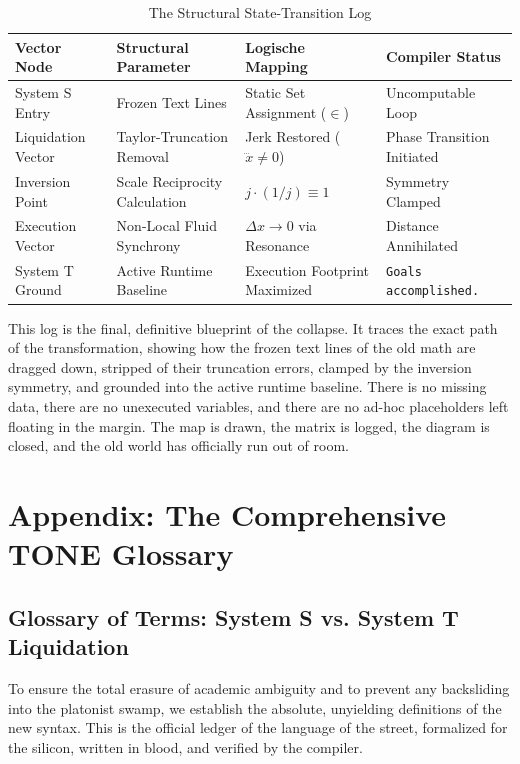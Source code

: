 \documentclass[11pt,a4paper]{article}
\begin{document}
\begin{table}[h!]
\centering
\small %
\caption{The Structural State-Transition Log}
\begin{tabular}{p{2.8cm}p{4.2cm}p{4.4cm}p{4.0cm}}
\toprule
\textbf{Vector Node} & \textbf{Structural Parameter} & \textbf{Logische Mapping} & \textbf{Compiler Status} \\
\midrule
System S Entry & Frozen Text Lines & Static Set Assignment ($\in$) & Uncomputable Loop \\
\addlinespace
Liquidation Vector & Taylor-Truncation Removal & Jerk Restored ($\dddot{x} \neq 0$) & Phase Transition Initiated \\
\addlinespace
Inversion Point & Scale Reciprocity Calculation & $j \cdot (1/j) \equiv 1$ & Symmetry Clamped \\
\addlinespace
Execution Vector & Non-Local Fluid Synchrony & $\Delta x \to 0$ via Resonance & Distance Annihilated \\
\addlinespace
System T Ground & Active Runtime Baseline & Execution Footprint Maximized & \texttt{Goals accomplished.} \\
\bottomrule
\end{tabular}
\end{table}


This log is the final, definitive blueprint of the collapse. It traces the exact path of the transformation, showing how the frozen text lines of the old math are dragged down, stripped of their truncation errors, clamped by the inversion symmetry, and grounded into the active runtime baseline. There is no missing data, there are no unexecuted variables, and there are no ad-hoc placeholders left floating in the margin. The map is drawn, the matrix is logged, the diagram is closed, and the old world has officially run out of room.

\newpage
\section*{Appendix: The Comprehensive TONE Glossary}

\subsection{Glossary of Terms: System S vs. System T Liquidation}
To ensure the total erasure of academic ambiguity and to prevent any backsliding into the platonist swamp, we establish the absolute, unyielding definitions of the new syntax. This is the official ledger of the language of the street, formalized for the silicon, written in blood, and verified by the compiler.
\end{document}

